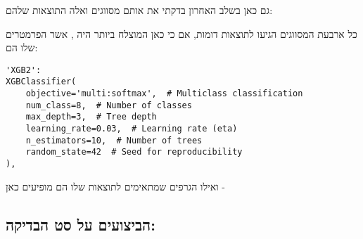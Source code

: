 גם כאן בשלב האחרון בדקתי את אותם מסווגים ואלה התוצאות שלהם:

כל ארבעת המסווגים הגיעו לתוצאות דומות, אם כי כאן המוצלח ביותר היה  , אשר הפרמטרים שלו הם:
\EN
\begin{lstlisting}
'XGB2': 
XGBClassifier(
    objective='multi:softmax',  # Multiclass classification
    num_class=8,  # Number of classes
    max_depth=3,  # Tree depth
    learning_rate=0.03,  # Learning rate (eta)
    n_estimators=10,  # Number of trees
    random_state=42  # Seed for reproducibility
),
\end{lstlisting}
\HE
\newpage
ואילו הגרפים שמתאימים לתוצאות שלו הם מופיעים כאן - 
\subsection*{הביצועים על סט הבדיקה:}
\clearpage
